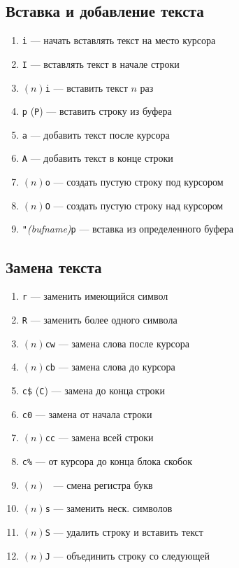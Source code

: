 \documentclass[a4paper,10pt, twocolumn]{article}
\newcommand*{\cod}[1]{\texttt{#1}}
\begin{document}
\subsection{Вставка и добавление текста}
\begin{enumerate}
    \item \cod{i} --- начать вставлять текст на место курсора
    \item \cod{I} --- вставлять текст в начале строки
    \item $(n)$\cod{i} --- вставить текст $n$
раз
    \item \cod{p} (\cod{P}) --- вставить строку из буфера
    \item \cod{a} --- добавить текст после курсора
    \item \cod{A} --- добавить текст в конце строки
    \item $(n)$\cod{o} --- создать пустую строку под курсором
    \item $(n)$\cod{O} --- создать пустую строку над курсором
    \item \cod{"}\textit{(bufname)}\cod{p} --- вставка из определенного буфера
\end{enumerate}

\subsection{Замена текста}
\begin{enumerate}
    \item \cod{r} --- заменить имеющийся символ
    \item \cod{R} --- заменить более одного символа
    \item $(n)$\cod{cw} --- замена слова после курсора
    \item $(n)$\cod{cb} --- замена слова до курсора
    \item \cod{c\$} (\cod{C}) --- замена до конца строки
    \item \cod{c0} --- замена от начала строки
    \item $(n)$\cod{cc} --- замена всей строки
    \item \cod{c\%} --- от курсора до конца блока скобок
    \item $(n)$\cod{~} --- смена регистра букв
    \item $(n)$\cod{s} --- заменить неск. символов
    \item $(n)$\cod{S} --- удалить строку и вставить текст
    \item $(n)$\cod{J} --- объединить строку со следующей
\end{enumerate}
\end{document}
